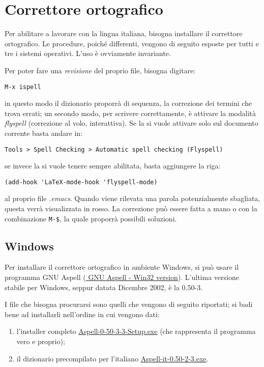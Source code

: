 \documentclass[10pt,a4paper]{article}
\begin{document}
\lipsum[1]

\section{Correttore ortografico}
\label{sec:corr}
Per abilitare \emacs{} a lavorare con la lingua italiana, bisogna
installare il correttore ortografico. Le procedure, poiché differenti,
vengono di seguito esposte per tutti e tre i sistemi operativi. 
L'uso è ovviamente invariante. 

Per poter fare una \emph{revisione} del proprio file, bisogna digitare:
\begin{verbatim}
M-x ispell
\end{verbatim}
in questo modo il dizionario proporrà di sequenza, la correzione
dei termini che trova errati; un secondo modo, per scrivere
correttamente, è attivare la modalità \emph{flyspell} (correzione al
volo, interattiva). Se la si vuole
attivare solo sul documento corrente basta andare in:
\begin{verbatim}
Tools > Spell Checking > Automatic spell checking (Flyspell)
\end{verbatim}
se invece la si vuole tenere sempre abilitata,
basta aggiungere la riga:
\begin{verbatim}
(add-hook 'LaTeX-mode-hook 'flyspell-mode)
\end{verbatim}
al proprio file \emph{.emacs}. Quando viene rilevata una parola
potenzialmente sbagliata, questa verrà visualizzata in rosso. La
correzione può essere fatta a mano o con la combinazione \verb!M-$!,
la quale proporrà possibili soluzioni.

\subsection*{Windows}
\label{sec:aspellwin}
Per installare il correttore ortografico in ambiente
Windows, si può usare il programma \textsf{GNU Aspell}
(\href{http://aspell.net/win32/}{\mano{} \textsf{GNU Aspell - Win32 version}}). L'ultima
versione stabile per Windows, seppur datata Dicembre 2002, è la \textsf{0.50-3}.

I file che bisogna procurarsi sono quelli che vengono di seguito
riportati; si badi bene ad installarli nell'ordine in cui vengono dati:

\begin{enumerate}
\item l'installer completo \href{http://ftp.gnu.org/gnu/aspell/w32/Aspell-0-50-3-3-Setup.exe}%
{\textsf{Aspell-0-50-3-3-Setup.exe}} (che rappresenta il programma
vero e proprio);
\item il dizionario precompilato per l'italiano
\href{http://ftp.gnu.org/gnu/aspell/w32/Aspell-it-0.50-2-3.exe}%
{\textsf{Aspell-it-0.50-2-3.exe}}.
\end{enumerate}
\end{document}

